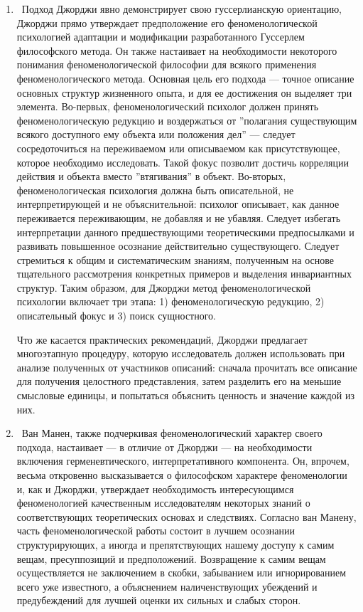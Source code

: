 \documentclass[11pt]{book}
\begin{document}
\begin{enumerate}

  \item\ Подход Джорджи явно демонстрирует свою гуссерлианскую ориентацию, Джорджи прямо утверждает предположение его феноменологической психологией адаптации и модификации разработанного Гуссерлем философского метода. Он также настаивает на необходимости некоторого понимания феноменологической философии для всякого применения феноменологического метода. Основная цель его подхода --- точное описание основных структур жизненного опыта, и для ее достижения он выделяет три элемента. Во-первых, феноменологический психолог должен принять феноменологическую редукцию и воздержаться от ''полагания существующим всякого доступного ему объекта или положения дел'' --- следует сосредоточиться на переживаемом или описываемом как присутствующее, которое необходимо исследовать. Такой фокус позволит достичь корреляции действия и объекта вместо ''втягивания'' в объект. Во-вторых, феноменологическая психология должна быть описательной, не интерпретирующей и не объяснительной: психолог описывает, как данное переживается переживающим, не добавляя и не убавляя. Следует избегать интерпретации данного предшествующими теоретическими предпосылками и развивать повышенное осознание действительно существующего. Следует стремиться к общим и систематическим знаниям, полученным на основе тщательного рассмотрения конкретных примеров и выделения инвариантных структур. Таким образом, для Джорджи метод феноменологической психологии включает три этапа: 1) феноменологическую редукцию, 2) описательный фокус и 3) поиск сущностного.

Что же касается практических рекомендаций, Джорджи предлагает многоэтапную процедуру, которую исследователь должен использовать при анализе полученных от участников описаний: сначала прочитать все описание для получения целостного представления, затем разделить его на меньшие смысловые единицы, и попытаться объяснить ценность и значение каждой из них.

  \item\ Ван Манен, также подчеркивая феноменологический характер своего подхода, настаивает --- в отличие от Джорджи --- на необходимости включения герменевтического, интерпретативного компонента. Он, впрочем, весьма откровенно высказывается о философском характере феноменологии и, как и Джорджи, утверждает необходимость интересующимся феноменологией качественным исследователям некоторых знаний о соответствующих теоретических основах и следствиях. Согласно ван Манену, часть феноменологической работы состоит в лучшем осознании структурирующих, а иногда и препятствующих нашему доступу к самим вещам, пресуппозиций и предположений. Возвращение к самим вещам осуществляется не заключением в скобки, забыванием или игнорированием всего уже известного, а объяснением наличенствующих убеждений и предубеждений для лучшей оценки их сильных и слабых сторон.


\end{enumerate}
\end{document}

